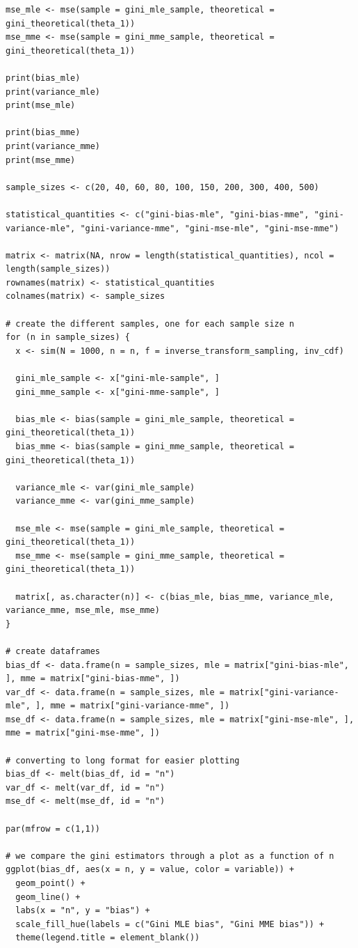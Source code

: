 \begin{verbatim}
mse_mle <- mse(sample = gini_mle_sample, theoretical = gini_theoretical(theta_1))
mse_mme <- mse(sample = gini_mme_sample, theoretical = gini_theoretical(theta_1))

print(bias_mle)
print(variance_mle)
print(mse_mle)

print(bias_mme)
print(variance_mme)
print(mse_mme)

sample_sizes <- c(20, 40, 60, 80, 100, 150, 200, 300, 400, 500) 

statistical_quantities <- c("gini-bias-mle", "gini-bias-mme", "gini-variance-mle", "gini-variance-mme", "gini-mse-mle", "gini-mse-mme")

matrix <- matrix(NA, nrow = length(statistical_quantities), ncol = length(sample_sizes))
rownames(matrix) <- statistical_quantities
colnames(matrix) <- sample_sizes

# create the different samples, one for each sample size n
for (n in sample_sizes) {
  x <- sim(N = 1000, n = n, f = inverse_transform_sampling, inv_cdf)

  gini_mle_sample <- x["gini-mle-sample", ]
  gini_mme_sample <- x["gini-mme-sample", ]

  bias_mle <- bias(sample = gini_mle_sample, theoretical = gini_theoretical(theta_1))
  bias_mme <- bias(sample = gini_mme_sample, theoretical = gini_theoretical(theta_1))

  variance_mle <- var(gini_mle_sample)
  variance_mme <- var(gini_mme_sample)

  mse_mle <- mse(sample = gini_mle_sample, theoretical = gini_theoretical(theta_1))
  mse_mme <- mse(sample = gini_mme_sample, theoretical = gini_theoretical(theta_1))

  matrix[, as.character(n)] <- c(bias_mle, bias_mme, variance_mle, variance_mme, mse_mle, mse_mme)
}

# create dataframes
bias_df <- data.frame(n = sample_sizes, mle = matrix["gini-bias-mle", ], mme = matrix["gini-bias-mme", ])
var_df <- data.frame(n = sample_sizes, mle = matrix["gini-variance-mle", ], mme = matrix["gini-variance-mme", ])
mse_df <- data.frame(n = sample_sizes, mle = matrix["gini-mse-mle", ], mme = matrix["gini-mse-mme", ])

# converting to long format for easier plotting
bias_df <- melt(bias_df, id = "n")
var_df <- melt(var_df, id = "n")
mse_df <- melt(mse_df, id = "n")

par(mfrow = c(1,1))

# we compare the gini estimators through a plot as a function of n
ggplot(bias_df, aes(x = n, y = value, color = variable)) +
  geom_point() + 
  geom_line() +
  labs(x = "n", y = "bias") +
  scale_fill_hue(labels = c("Gini MLE bias", "Gini MME bias")) +
  theme(legend.title = element_blank())


\end{verbatim}
